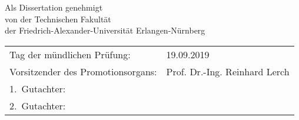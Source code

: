 \thispagestyle{empty}


\vspace{4cm}
\begin{center}
        Als Dissertation genehmigt\\
        von der Technischen Fakultät\\
        der Friedrich-Alexander-Universität Erlangen-Nürnberg
\end{center}
    

\vspace{2cm}
\begin{tabular}{ll}
    Tag der mündlichen Prüfung:& 19.09.2019 \\

    Vorsitzender des Promotionsorgans: 	& Prof. Dr.-Ing. Reinhard Lerch  \\
    1.~Gutachter: 		& \myProf\\
    2.~Gutachter: 		& \myOtherProf\\

\end{tabular}

\vfill

    
\bigskip

